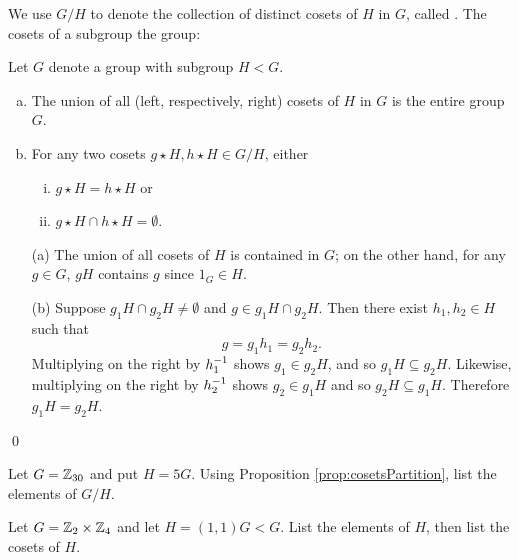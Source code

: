 \documentclass[../algebraNotesMSRI-UP2016.tex]{subfiles}
\begin{document}
\begin{frame}
We use $G/H$ to denote the collection of distinct cosets of $H$ in $G$, called .  The cosets of a subgroup  the group:
\begin{prop}\label{prop:cosetsPartition}
Let $G$ denote a group with subgroup $H< G$.
\begin{enumerate}[(a)]
\item The union of all (left, respectively, right) cosets of $H$ in $G$ is the entire group $G$.
\item For any two cosets $g\star H,h\star H\in G/H$, either
\begin{enumerate}[(i)]
	\item $g\star H=h\star H$ or
	\item $g\star H\cap h\star H=\emptyset$.
\end{enumerate}
\end{enumerate}
\end{prop}

\smallGap
\pf
\begin{itemize}
\item[(a)] The union of all cosets of $H$ is contained in $G$; on the other hand, for any $g\in G$, $gH$ contains $g$ since $1_G\in H$.
\end{itemize}
\end{frame}

\begin{frame}[c]
\begin{itemize}
\item[(b)] Suppose $g_1H\cap g_2H\neq \emptyset$ and $g\in g_1H\cap g_2H$.  Then there exist $h_1,h_2\in H$ such that 
\[
g=g_1h_1=g_2h_2.
\]
Multiplying on the right by $h_1^{-1}$ shows $g_1\in g_2H$, and so $g_1H\subseteq g_2H$.  Likewise, multiplying on the right by $h_2^{-1}$ shows $g_2\in g_1H$ and so $g_2H\subseteq g_1H$.  Therefore $g_1H=g_2H$.
\end{itemize}
\qed
\end{frame}

\begin{frame}[c]
\begin{exe}[cf. Problem 66]\label{exe:prob66}
Let $G=\mathbb Z_{30}$ and put $H=5G$.  Using Proposition \ref{prop:cosetsPartition}, list the elements of $G/H$.  
\end{exe}

\smallGap
\begin{exe}[cf. Problem 67]\label{exe:prob67}
Let $G=\mathbb Z_2\times \mathbb Z_4$ and let $H=(1,1)G< G$.  List the elements of $H$, then list the cosets of $H$.
\end{exe}
\end{frame}
\end{document}
